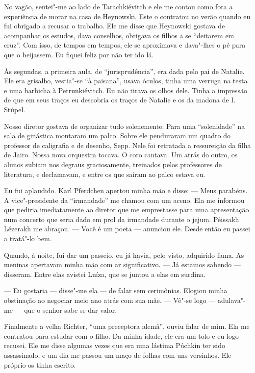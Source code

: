 No vagão, sentei"-me ao lado de Tarachkiévitch e ele me contou como fora
a experiência de morar na casa de Heynowski. Este o contratou no verão
quando eu fui obrigado a recusar o trabalho. Ele me disse que Heynowski
gostava de acompanhar os estudos, dava conselhos, obrigava os filhos a
se ``deitarem em cruz''. Com isso, de tempos em tempos, ele se
aproximava e dava"-lhes o pé para que o beijassem. Eu fiquei feliz por
não ter ido lá.

Às segundas, a primeira aula, de ``jurisprudência'', era dada pelo pai
de Natalie. Ele era grisalho, vestia"-se ``à paisana'', usava óculos,
tinha uma verruga na testa e uma barbicha à Petrunkiévitch. Eu não
tirava os olhos dele. Tinha a impressão de que em seus traços eu
descobria os traços de Natalie e os da madona de I. Stúpel.

Nosso diretor gostava de organizar tudo solenemente. Para uma
``solenidade'' na sala de ginástica montaram um palco. Sobre ele
penduraram um quadro do professor de caligrafia e de desenho, Sepp. Nele
foi retratada a ressureição da filha de Jairo. Nossa nova orquestra
tocava. O coro cantava. Um atrás do outro, os alunos subiam nos degraus
graciosamente, treinados pelos professores de literatura, e declamavam,
e entre os que saíram ao palco estava eu.

Eu fui aplaudido. Karl Pferdchen apertou minha mão e disse: --- Meus
parabéns. A vice"-presidente da ``irmandade'' me chamou com um aceno. Ela
me informou que pediria imediatamente ao diretor que me emprestasse para
uma apresentação num concerto que seria dado em prol da irmandade
durante o jejum. Péissakh Lézerakh me abraçou. --- Você é um poeta ---
anunciou ele. Desde então eu passei a tratá"-lo bem.

Quando, à noite, fui dar um passeio, eu já havia, pelo visto, adquirido
fama. As meninas apertavam minha mão com ar significativo. --- Já
estamos sabendo --- disseram. Entre elas avistei Luíza, que se juntou a
elas em surdina.

--- Eu gostaria --- disse"-me ela --- de falar sem cerimônias. Elogiou
minha obstinação ao negociar meio ano atrás com sua mãe. --- Vê"-se logo
--- adulava"-me --- que o senhor sabe se dar valor.

Finalmente a velha Richter, ``uma preceptora alemã'', ouviu falar de
mim. Ela me contratou para estudar com o filho. Da minha idade, ele era
um tolo e eu logo recusei. Ele me disse algumas vezes que era uma
lástima Púchkin ter sido assassinado, e um dia me passou um maço de
folhas com uns versinhos. Ele próprio os tinha escrito.


